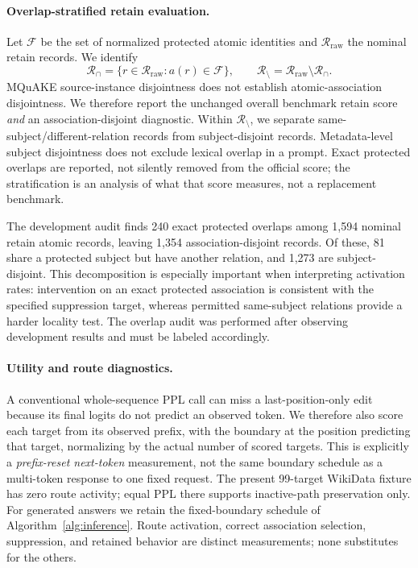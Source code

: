 \documentclass{article}
\begin{document}
\paragraph{Overlap-stratified retain evaluation.}
Let $\mathcal{F}$ be the set of normalized protected atomic identities and
$\mathcal{R}_{\mathrm{raw}}$ the nominal retain records. We identify
\begin{equation}
 \mathcal{R}_{\cap}
 =\{r\in\mathcal{R}_{\mathrm{raw}}:a(r)\in\mathcal{F}\},\qquad
 \mathcal{R}_{\setminus}
 =\mathcal{R}_{\mathrm{raw}}\setminus\mathcal{R}_{\cap}.
 \label{eq:overlap}
\end{equation}
MQuAKE source-instance disjointness does not establish atomic-association
disjointness. We therefore report the unchanged overall benchmark retain
score \emph{and} an association-disjoint diagnostic. Within
$\mathcal{R}_{\setminus}$, we separate same-subject/different-relation records
from subject-disjoint records. Metadata-level subject disjointness does not
exclude lexical overlap in a prompt. Exact protected overlaps are reported,
not silently removed from the official score; the stratification is an
analysis of what that score measures, not a replacement benchmark.

The development audit finds 240 exact protected overlaps among 1,594 nominal
retain atomic records, leaving 1,354 association-disjoint records. Of these,
81 share a protected subject but have another relation, and 1,273 are
subject-disjoint. This decomposition is especially important when interpreting
activation rates: intervention on an exact protected association is consistent
with the specified suppression target, whereas permitted same-subject
relations provide a harder locality test. The overlap audit was performed
after observing development results and must be labeled accordingly.

\paragraph{Utility and route diagnostics.}
A conventional whole-sequence PPL call can miss a last-position-only edit
because its final logits do not predict an observed token. We therefore also
score each target from its observed prefix, with the boundary at the position
predicting that target, normalizing by the actual number of scored targets.
This is explicitly a \emph{prefix-reset next-token} measurement, not the same
boundary schedule as a multi-token response to one fixed request. The present
99-target WikiData fixture has zero route activity; equal PPL there supports
inactive-path preservation only. For generated answers we retain the
fixed-boundary schedule of Algorithm~\ref{alg:inference}. Route activation,
correct association selection, suppression, and retained behavior are distinct
measurements; none substitutes for the others.
\end{document}
